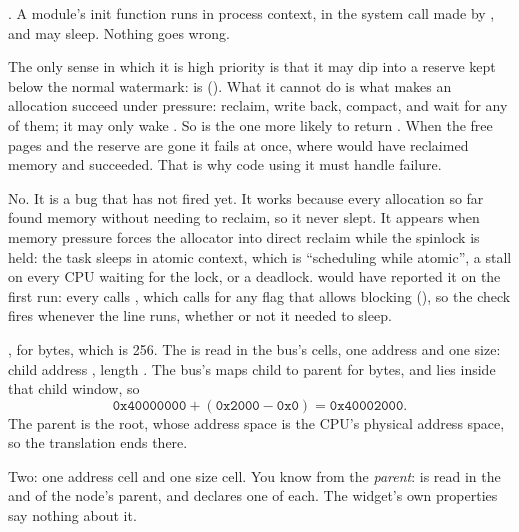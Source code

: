  . A module's init function runs in process context, in the
 system call made by , and may sleep. Nothing goes wrong.

 The only sense in which it is high priority is that it may dip into a reserve kept below
the normal watermark:  is 
(). What it cannot do is what makes an allocation succeed under
pressure: reclaim, write back, compact, and wait for any of them; it may only wake . So
 is the one more likely to return . When the free pages and the reserve
are gone it fails at once, where  would have reclaimed memory and succeeded. That
is why code using it must handle failure.

 No. It is a bug that has not fired yet. It works because every allocation so far found
memory without needing to reclaim, so it never slept. It appears when memory pressure forces the
allocator into direct reclaim while the spinlock is held: the task sleeps in atomic context, which
is ``scheduling while atomic'', a stall on every CPU waiting for the lock, or a deadlock.
 would have reported it on the first run: every 
calls , which calls  for any flag that allows blocking
(), so the check fires whenever the line runs, whether or not it
needed to sleep.


 , for  bytes, which is 256. The  is read in the
bus's cells, one address and one size: child address , length . The bus's
 maps child  to parent  for  bytes, and
 lies inside that child window, so
\[
  \texttt{0x40000000} + (\texttt{0x2000} - \texttt{0x0}) = \texttt{0x40002000}.
\]
The parent is the root, whose address space is the CPU's physical address space, so the translation
ends there.

 Two: one address cell and one size cell. You know from the \emph{parent}:  is
read in the  and  of the node's parent, and
 declares one of each. The widget's own properties say nothing about it.

